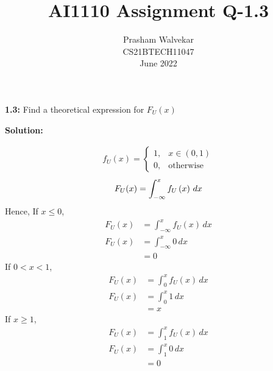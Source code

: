 \documentclass[journal,12pt,two column]{IEEEtran}
\title{AI1110 Assignment Q-1.3 }
\author{Prasham Walvekar \\ CS21BTECH11047 \\\vspace*{20pt} June 2022}
\newcommand*{\permcomb}[4][0mu]{{{}^{#3}\mkern#1#2_{#4}}}
\begin{document}
\maketitle

\newcommand{\solution}{\noindent \textbf{Solution: }}
\providecommand{\pr}[1]{\ensuremath{\Pr\left(#1\right)}}
\providecommand{\cdf}[2]{\ensuremath{\text{F}_{#1}\left(#2\right)}}
\providecommand{\qfunc}[1]{\ensuremath{Q\left(#1\right)}}
\providecommand{\sbrak}[1]{\ensuremath{{}\left[#1\right]}}
\providecommand{\lsbrak}[1]{\ensuremath{{}\left[#1\right.}}
\providecommand{\rsbrak}[1]{\ensuremath{{}\left.#1\right]}}
\providecommand{\brak}[1]{\ensuremath{\left(#1\right)}}
\providecommand{\lbrak}[1]{\ensuremath{\left(#1\right.}}
\providecommand{\rbrak}[1]{\ensuremath{\left.#1\right)}}
\providecommand{\cbrak}[1]{\ensuremath{\left\{#1\right\}}}
\providecommand{\lcbrak}[1]{\ensuremath{\left\{#1\right.}}
\newcommand*{\comb}[1][-1mu]{\permcomb[#1]{C}}
\renewcommand{\thetable}{\arabic{table}}
\providecommand{\rcbrak}[1]{\ensuremath{\left.#1\right\}}}
\newcommand{\myvec}[1]{\ensuremath{\begin{pmatrix}#1\end{pmatrix}}}
\newcommand{\mydet}[1]{\ensuremath{\begin{vmatrix}#1\end{vmatrix}}}
\let\vec\mathbf

\textbf{1.3:} Find a theoretical expression for $F_U(x)$

\solution

\begin{align}  
f_{U}\brak{x} = 
\begin{cases}
1, & x\in (0,1) \\
0, & \text{otherwise}
\end{cases}
\end{align}
\begin{equation}
    F_U(x) = \int_{-\infty}^{x} f_{U}\brak{x} \,dx  \\
\end{equation}
Hence,
If $ x \leq 0 $,
\begin{align}
    F_U(x) &= \int_{-\infty}^{x} f_{U}\brak{x} \,dx  \\
    F_U(x) &= \int_{-\infty}^{x} 0 \,dx  \\
           &= 0
\end{align}
If $0 <x <1$,
\begin{align}
    F_U(x) &= \int_{0}^{x} f_{U}\brak{x} \,dx  \\
    F_U(x) &= \int_{0}^{x} 1 \,dx  \\
           &= x
\end{align}
If $x \geq 1$,
\begin{align}
    F_U(x) &= \int_{1}^{x} f_{U}\brak{x} \,dx  \\
    F_U(x) &= \int_{1}^{x} 0 \,dx  \\
           &= 0
\end{align}
\end{document}
